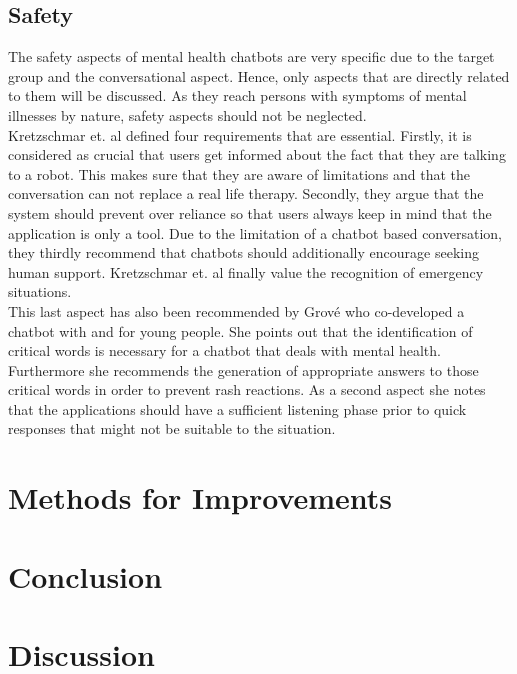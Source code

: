 \documentclass[sigconf, nonacm]{acmart}
\begin{document}
\subsection{Safety}
The safety aspects of mental health chatbots are very specific due to the target group and the conversational aspect. Hence, only aspects that are directly related to them will be discussed.
As they reach persons with symptoms of mental illnesses by nature, safety aspects should not be neglected. 
\\
Kretzschmar et. al \cite{Kretzschmar2019} defined four requirements that are essential. Firstly, it is considered as crucial that users get informed about the fact that they are talking to a robot. This makes sure that they are aware of limitations and that the conversation can not replace a real life therapy.
Secondly, they argue that the system should prevent over reliance so that users always keep in mind that the application is only a tool. 
Due to the limitation of a chatbot based conversation, they thirdly recommend that chatbots should additionally encourage seeking human support.
Kretzschmar et. al finally value the recognition of emergency situations.
\\
This last aspect has also been recommended by Grové \cite{Grove2021} who co-developed a chatbot with and for young people. She points out that the identification of critical words is necessary for a chatbot that deals with mental health.
Furthermore she recommends the generation of appropriate answers to those critical words in order to prevent rash reactions.
As a second aspect she notes that the applications should have a sufficient listening phase prior to quick responses that might not be suitable to the situation. 


\section{Methods for Improvements}

\section{Conclusion}

\section{Discussion}





\appendix
\end{document}
